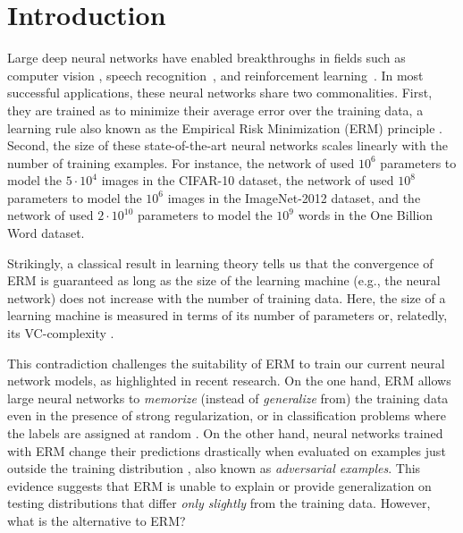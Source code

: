 \section{Introduction}

Large deep neural networks have enabled breakthroughs in fields such as
computer vision \citep{krizhevsky2012imagenet}, speech
recognition~\citep{hinton2012deep}, and reinforcement
learning~\citep{silver2016mastering}.  In most successful applications, these
neural networks share two commonalities.  First, they are trained as to
minimize their average error over the training data, a learning rule also known
as the Empirical Risk Minimization (ERM) principle \citep{vapnik98}.  Second,
the size of these state-of-the-art neural networks scales linearly with the
number of training examples.  For instance, the network of
\citet{springenberg2014striving} used $10^6$ parameters to model the $5 \cdot
10^4$ images in the CIFAR-10 dataset, the network of \citep{simonyan2014very}
used $10^8$ parameters to model the $10^6$ images in the ImageNet-2012 dataset,
and the network of \citet{chelba2013one} used $2 \cdot 10^{10}$ parameters to
model the $10^9$ words in the One Billion Word dataset. 

Strikingly, a classical result in learning theory \citep{vapnik1971uniform}
tells us that the convergence of ERM is guaranteed as long as the size of the
learning machine (e.g., the neural network) does not increase with the number
of training data. Here, the size of a learning machine is measured in terms of
its number of parameters or, relatedly, its VC-complexity
\citep{harvey2017nearly}.

This contradiction challenges the suitability of ERM to train our current
neural network models, as highlighted in recent research.  On the one hand, ERM
allows large neural networks to \emph{memorize} (instead of \emph{generalize}
from) the training data even in the presence of strong regularization, or in
classification problems where the labels are assigned at random
\citep{2016arXiv161103530Z}. On the other hand, neural networks trained with
ERM change their predictions drastically when evaluated on examples just
outside the training distribution \citep{SzegedyZSBEGF13}, also known as
\emph{adversarial examples}.  This evidence suggests that ERM is unable to
explain or provide generalization on testing distributions that differ
\emph{only slightly} from the training data. However, what is the alternative
to ERM? 

